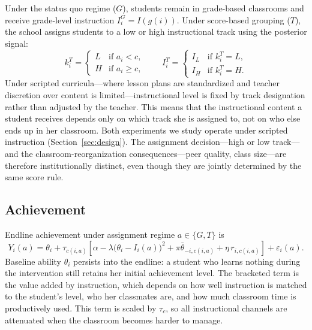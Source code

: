 \documentclass[11pt]{article}
\begin{document}
Under the status quo regime ($G$), students remain in grade-based classrooms and receive grade-level instruction $I_i^G = I(g(i))$. Under score-based grouping ($T$), the school assigns students to a low or high instructional track using the posterior signal:
\begin{equation}
k_i^T =
\begin{cases}
L & \text{if } a_i < c, \\
H & \text{if } a_i \geq c,
\end{cases}
\qquad
I_i^T =
\begin{cases}
I_L & \text{if } k_i^T = L, \\
I_H & \text{if } k_i^T = H.
\end{cases}
\end{equation}
Under scripted curricula---where lesson plans are standardized and teacher discretion over content is limited---instructional level is fixed by track designation rather than adjusted by the teacher. This means that the instructional content a student receives depends only on which track she is assigned to, not on who else ends up in her classroom. Both experiments we study operate under scripted instruction (Section~\ref{sec:design}). The assignment decision---high or low track---and the classroom-reorganization consequences---peer quality, class size---are therefore institutionally distinct, even though they are jointly determined by the same score rule.

\subsection{Achievement}

Endline achievement under assignment regime $a \in \{G, T\}$ is
\begin{equation}
\label{eq:learning}
Y_i(a) = \theta_i + \tau_{c(i,a)} \left[\alpha - \lambda\big(\theta_i - I_i(a)\big)^2 + \pi\bar{\theta}_{-i,c(i,a)} + \eta\, r_{i,c(i,a)}\right] + \varepsilon_i(a).
\end{equation}
Baseline ability $\theta_i$ persists into the endline: a student who learns nothing during the intervention still retains her initial achievement level. The bracketed term is the value added by instruction, which depends on how well instruction is matched to the student's level, who her classmates are, and how much classroom time is productively used. This term is scaled by $\tau_c$, so all instructional channels are attenuated when the classroom becomes harder to manage.
\end{document}
